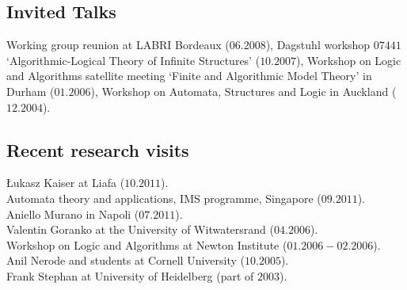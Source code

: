 \documentclass[a4paper]{article}
\newif\ifcut
\begin{document}
\subsection*{Invited Talks}
Working group reunion at LABRI Bordeaux ($06.2008$), Dagstuhl workshop $07441$ `Algorithmic-Logical Theory of Infinite Structures' ($10.2007$), Workshop on Logic and Algorithms
satellite meeting `Finite and Algorithmic Model Theory' in Durham ($01.2006$), Workshop on Automata, Structures and Logic in Auckland ($12.2004$).




\subsection*{Recent research visits} 

\L ukasz Kaiser at Liafa ($10.2011$).\\

Automata theory and applications, IMS programme,  Singapore ($09.2011$).\\

Aniello Murano in Napoli ($07.2011$).\\


\ifcut
Valentin Goranko at the University of Witwatersrand ($04.2006$).\\

Workshop on Logic and Algorithms at Newton Institute ($01.2006 - 02.2006$).\\

Anil Nerode and students at Cornell University ($10.2005$).\\

Frank Stephan at University of Heidelberg (part of $2003$).\\
\end{document}
